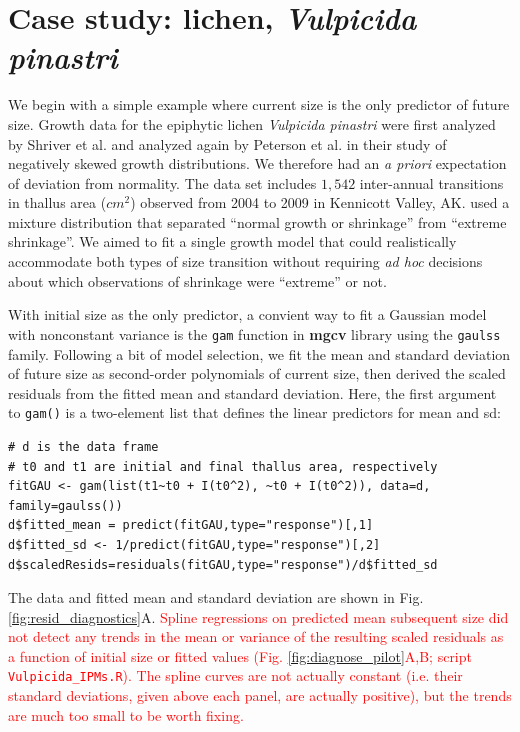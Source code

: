 \documentclass[12pt]{article}
\newcommand{\new}{\textcolor{red}}
\begin{document}
\section{Case study: lichen, \emph{Vulpicida pinastri}}
\label{sec:lichenCaseStudy} 
We begin with a simple example where current size is the only predictor of future size. 
Growth data for the epiphytic lichen \emph{Vulpicida pinastri} were first analyzed by Shriver et al. \citeyear{shriver2012comparative} and analyzed again by Peterson et al. \citeyear{peterson2019improving} in their study of negatively skewed growth distributions. 
We therefore had an \emph{a priori} expectation of deviation from normality. 
The data set includes $1,542$ inter-annual transitions in thallus area ($cm^2$) observed from 2004 to 2009 in Kennicott Valley, AK. 
\citeyear{shriver2012comparative} used a mixture distribution that separated ``normal growth or shrinkage'' from ``extreme shrinkage''. 
We aimed to fit a single growth model that could realistically accommodate both types of size transition without requiring \emph{ad hoc} decisions about which observations of shrinkage were ``extreme'' or not.

With initial size as the only predictor, a convient way to fit a Gaussian model with nonconstant variance is the \texttt{gam} function in \textbf{mgcv} library \citep{wood-2017} using the \texttt{gaulss} family. 
Following a bit of model selection, we fit the mean and standard deviation of future size as second-order polynomials of current size, then derived the scaled residuals from the fitted mean and standard deviation.
Here, the first argument to \texttt{gam()} is a two-element list that defines the linear predictors for mean and sd:
\begin{lstlisting}
# d is the data frame
# t0 and t1 are initial and final thallus area, respectively
fitGAU <- gam(list(t1~t0 + I(t0^2), ~t0 + I(t0^2)), data=d, family=gaulss())
d$fitted_mean = predict(fitGAU,type="response")[,1]
d$fitted_sd <- 1/predict(fitGAU,type="response")[,2]
d$scaledResids=residuals(fitGAU,type="response")/d$fitted_sd
\end{lstlisting}
The data and fitted mean and standard deviation are shown in Fig. \ref{fig:resid_diagnostics}A. 
\new{Spline regressions on predicted mean subsequent size did not detect any trends in the mean or variance of the resulting scaled residuals 
as a function of initial size or fitted values (Fig. \ref{fig:diagnose_pilot}A,B; script \texttt{Vulpicida\_IPMs.R}). The spline curves are not actually  
constant (i.e. their standard deviations, given above each panel, are actually positive), but the trends are much too small to be worth fixing.} 
\end{document}
